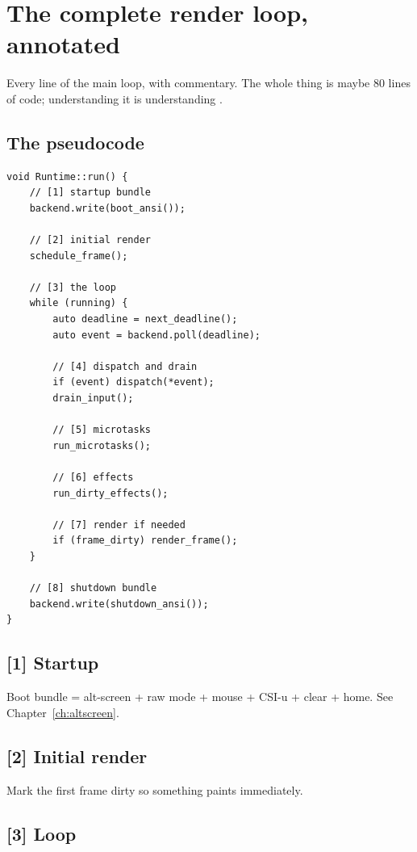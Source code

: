 \chapter{The complete render loop, annotated}
\label{ch:loopannotated}

\begin{aside}
Every line of the main loop, with commentary. The whole thing
is maybe 80 lines of code; understanding it is understanding
\maya{}.
\end{aside}

\section{The pseudocode}

\begin{lstlisting}
void Runtime::run() {
    // [1] startup bundle
    backend.write(boot_ansi());

    // [2] initial render
    schedule_frame();

    // [3] the loop
    while (running) {
        auto deadline = next_deadline();
        auto event = backend.poll(deadline);

        // [4] dispatch and drain
        if (event) dispatch(*event);
        drain_input();

        // [5] microtasks
        run_microtasks();

        // [6] effects
        run_dirty_effects();

        // [7] render if needed
        if (frame_dirty) render_frame();
    }

    // [8] shutdown bundle
    backend.write(shutdown_ansi());
}
\end{lstlisting}

\section{[1] Startup}

Boot bundle = alt-screen + raw mode + mouse + CSI-u +
clear + home. See Chapter~\ref{ch:altscreen}.

\section{[2] Initial render}

Mark the first frame dirty so something paints
immediately.

\section{[3] Loop}

